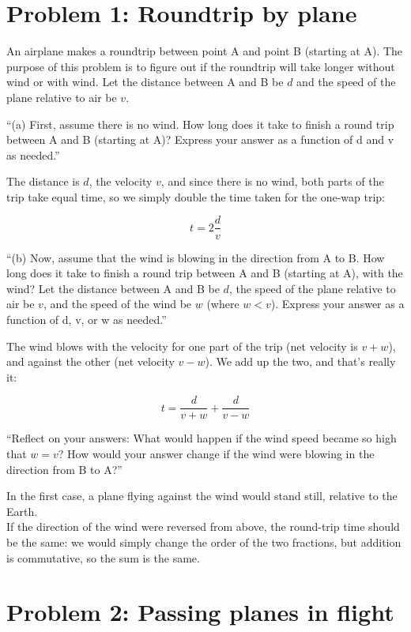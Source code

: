 \documentclass[12pt,a4paper]{report}
\begin{document}
\section{Problem 1: Roundtrip by plane}

An airplane makes a roundtrip between point A and point B (starting at A). The purpose of this problem is to figure out if the roundtrip will take longer without wind or with wind. Let the distance between A and B be $d$ and the speed of the plane relative to air be $v$.

``(a) First, assume there is no wind. How long does it take to finish a round trip between A and B (starting at A)? Express your answer as a function of d and v as needed.''

The distance is $d$, the velocity $v$, and since there is no wind, both parts of the trip take equal time, so we simply double the time taken for the one-wap trip:

\begin{equation}
t = 2 \frac{d}{v}
\end{equation}

``(b) Now, assume that the wind is blowing in the direction from A to B. How long does it take to finish a round trip between A and B (starting at A), with the wind? Let the distance between A and B be $d$, the speed of the plane relative to air be $v$, and the speed of the wind be $w$ (where $w < v$). Express your answer as a function of d, v, or w as needed.''

The wind blows with the velocity for one part of the trip (net velocity is $v + w$), and against the other (net velocity $v - w$). We add up the two, and that's really it:

\begin{equation}
t = \frac{d}{v + w} + \frac{d}{v - w}
\end{equation}

``Reflect on your answers: What would happen if the wind speed became so high that $w = v$? How would your answer change if the wind were blowing in the direction from B to A?''

In the first case, a plane flying against the wind would stand still, relative to the Earth.\\
If the direction of the wind were reversed from above, the round-trip time should be the same: we would simply change the order of the two fractions, but addition is commutative, so the sum is the same.

\section{Problem 2: Passing planes in flight}
\end{document}
